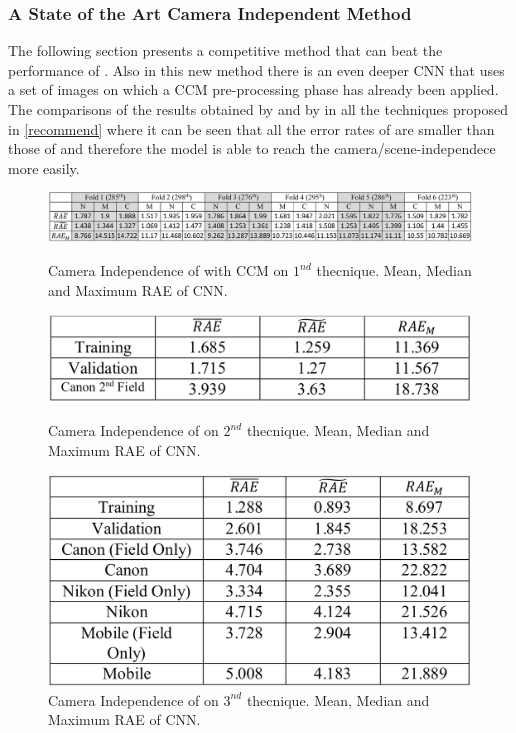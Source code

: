 \subsubsection{A State of the Art Camera Independent Method}
The following section presents a competitive method \cite{0807099125} that can beat the 
performance of \cite{0807099122}. Also in this new method there is an even deeper CNN 
that uses a set of images on which a CCM pre-processing phase has already 
been applied. The comparisons of the results obtained by \cite{0807099122} and by \cite{0807099125} in 
all the techniques proposed in \ref{recommend} where it can be seen that all the error 
rates of \cite{0807099125} are smaller than those of \cite{0807099122} and therefore the model is able to 
reach the camera/scene-independece more easily.
\begin{figure}[htbp]
    \centering
    \includegraphics[width = 1 \linewidth]{images/paper4/25tech1.png}
    \centering
    \caption{Camera Independence of \cite{0807099122} with CCM on $ 1^{nd} $ thecnique. Mean, Median and Maximum RAE of CNN.}
    \label{fig:25t1}
    \begin{minipage}[t]{.45\linewidth}
        \centering
        \includegraphics[width=\linewidth]{images/paper4/25tech2.png}
        \caption{\small Camera Independence of \cite{0807099122} on $ 2^{nd} $ thecnique. Mean, Median and Maximum RAE of CNN.}\label{fig:1}
    \end{minipage}
    \hfill
    \begin{minipage}{.45\linewidth}
        \centering
        \includegraphics[width=\linewidth]{images/paper4/25tech3.png}
        \caption{\small Camera Independence of \cite{0807099122} on $ 3^{nd} $ thecnique. Mean, Median and Maximum RAE of CNN.}\label{fig:1}
    \end{minipage}  
    \label{fig:1-2}
\end{figure}

